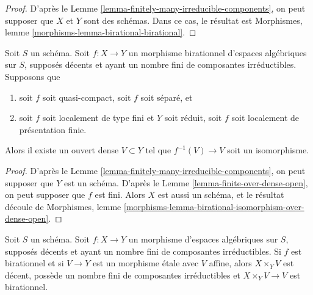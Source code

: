 \begin{proof}
D'après le Lemme \ref{lemma-finitely-many-irreducible-components},
on peut supposer que $X$ et $Y$ sont des schémas. Dans ce cas, le résultat est
Morphismes, lemme \ref{morphisms-lemma-birational-birational}.
\end{proof}

\begin{lemma}
\label{lemma-birational-isomorphism-over-dense-open}
Soit $S$ un schéma. Soit $f : X \to Y$ un morphisme birationnel d'espaces
algébriques sur $S$, supposés décents et ayant un nombre fini de composantes
irréductibles. Supposons que
\begin{enumerate}
\item soit $f$ soit quasi-compact, soit $f$ soit séparé, et
\item soit $f$ soit localement de type fini et $Y$ soit réduit, soit $f$
soit localement de présentation finie.
\end{enumerate}
Alors il existe un ouvert dense $V \subset Y$ tel que
$f^{-1}(V) \to V$ soit un isomorphisme.
\end{lemma}

\begin{proof}
D'après le Lemme \ref{lemma-finitely-many-irreducible-components},
on peut supposer que $Y$ est un schéma. D'après le
Lemme \ref{lemma-finite-over-dense-open}, on peut supposer que $f$ est fini.
Alors $X$ est aussi un schéma, et le résultat découle de Morphismes,
lemme \ref{morphisms-lemma-birational-isomorphism-over-dense-open}.
\end{proof}

\begin{lemma}
\label{lemma-birational-etale-localization}
Soit $S$ un schéma. Soit $f : X \to Y$ un morphisme d'espaces algébriques
sur $S$, supposés décents et ayant un nombre fini de composantes
irréductibles. Si $f$ est birationnel et si $V \to Y$ est un morphisme étale
avec $V$ affine, alors $X \times_Y V$ est décent, possède un nombre fini de
composantes irréductibles et $X \times_Y V \to V$ est birationnel.
\end{lemma}

